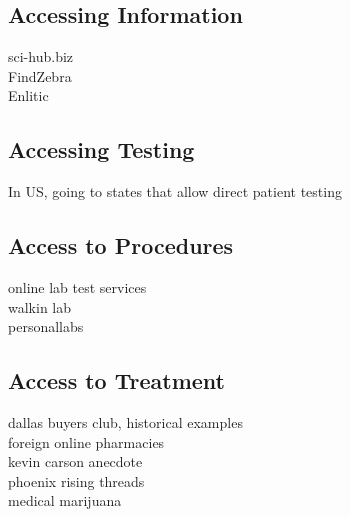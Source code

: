 \documentclass{article}
\begin{document}
\subsection{Accessing Information}
sci-hub.biz\\
FindZebra\\
Enlitic

\cite{scholz2016platform}



\subsection{Accessing Testing}

In US, going to states that allow direct patient testing

\subsection{Access to Procedures}



online lab test services\\
walkin lab\\
personallabs\\


\subsection{Access to Treatment}

dallas buyers club, historical examples\\
foreign online pharmacies\\
kevin carson anecdote\\
phoenix rising threads\\
medical marijuana\\
\end{document}
